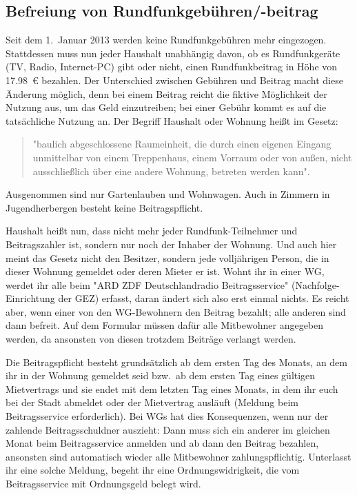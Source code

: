 \begin{multicols*}{2}
\subsection*{Befreiung von Rundfunkgebühren/-beitrag}
Seit dem 1.~Januar 2013 werden keine Rundfunkgebühren mehr eingezogen. Stattdessen muss nun jeder Haushalt unabhängig davon, ob es Rundfunkgeräte (TV, Radio, Internet-PC) gibt oder nicht, einen Rundfunkbeitrag in Höhe von \SI{17,98}{\euro} bezahlen. Der Unterschied zwischen Gebühren und Beitrag macht diese Änderung möglich, denn bei einem Beitrag reicht die fiktive Möglichkeit der Nutzung aus, um das Geld einzutreiben; bei einer Gebühr kommt es auf die tatsächliche Nutzung an. Der Begriff Haushalt oder Wohnung heißt im Gesetz:
\begin{quote}
"baulich abgeschlossene Raumeinheit, die durch einen eigenen Eingang unmittelbar von einem Treppenhaus, einem Vorraum oder von außen, nicht ausschließlich über eine andere Wohnung, betreten werden kann".
\end{quote}
Ausgenommen sind nur Gartenlauben und Wohnwagen. Auch in Zimmern in Jugendherbergen besteht keine Beitragspflicht.

Haushalt heißt nun, dass nicht mehr jeder Rundfunk-Teilnehmer und Beitragszahler ist, sondern nur noch der Inhaber der Wohnung. Und auch hier meint das Gesetz nicht den Besitzer, sondern jede volljährigen Person, die in dieser Wohnung gemeldet oder deren Mieter er ist. Wohnt ihr in einer WG, werdet ihr alle beim "ARD ZDF Deutschlandradio Beitragsservice" (Nachfolge-Einrichtung der GEZ) erfasst, daran ändert sich also erst einmal nichts. Es reicht aber, wenn einer von den WG-Bewohnern den Beitrag bezahlt; alle anderen sind dann befreit. Auf dem Formular müssen dafür alle Mitbewohner angegeben werden, da ansonsten von diesen trotzdem Beiträge verlangt werden.

Die Beitragspflicht besteht grundsätzlich ab dem ersten Tag des Monats, an dem ihr in der Wohnung gemeldet seid bzw.\ ab dem ersten Tag eines gültigen Mietvertrags und sie endet mit dem letzten Tag eines Monats, in dem ihr euch bei der Stadt abmeldet oder der Mietvertrag ausläuft (Meldung beim Beitragsservice erforderlich). Bei WGs hat dies Konsequenzen, wenn nur der zahlende Beitragsschuldner auszieht: Dann muss sich ein anderer im gleichen Monat beim Beitragsservice anmelden und ab dann den Beitrag bezahlen, ansonsten sind automatisch wieder alle Mitbewohner zahlungspflichtig. Unterlasst ihr eine solche Meldung, begeht ihr eine Ordnungswidrigkeit, die vom Beitragsservice mit Ordnungsgeld belegt wird.


\end{multicols*}
